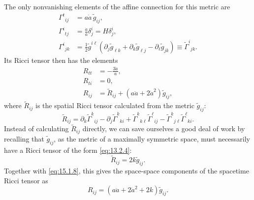 The only nonvanishing elements of the affine connection for this metric are
\begin{align}
  \Gamma^t{}_{ij}
  &=a\dot a\,\widetilde g_{ij},
  \tag{15.1.3}\label{eq:15.1.3}\\
  \Gamma^i{}_{tj}
  &=\frac{\dot a}{a}\delta^i_j
  =H\delta^i_j,
  \tag{15.1.4}\label{eq:15.1.4}\\
  \Gamma^i{}_{jk}
  &=\frac12\widetilde g^{i\ell}
    \left(
      \partial_j\widetilde g_{\ell k}
      +\partial_k\widetilde g_{\ell j}
      -\partial_\ell\widetilde g_{jk}
    \right)
  \equiv\widetilde\Gamma^i{}_{jk}.
  \tag{15.1.5}\label{eq:15.1.5}
\end{align}
Its Ricci tensor then has the elements
\begin{align}
  R_{tt}
  &=-\frac{3\ddot a}{a},
  \tag{15.1.6}\label{eq:15.1.6}\\
  R_{ti}
  &=0,
  \tag{15.1.7}\label{eq:15.1.7}\\
  R_{ij}
  &=\widetilde R_{ij}
    +(a\ddot a+2\dot a^2)\widetilde g_{ij},
  \tag{15.1.8}\label{eq:15.1.8}
\end{align}
where \(\widetilde R_{ij}\) is the spatial Ricci tensor calculated from the
metric \(\widetilde g_{ij}\):
\begin{equation}
  \widetilde R_{ij}
  =
  \partial_k\widetilde\Gamma^k{}_{ij}
  -\partial_j\widetilde\Gamma^k{}_{ki}
  +\widetilde\Gamma^k{}_{k\ell}\widetilde\Gamma^\ell{}_{ij}
  -\widetilde\Gamma^k{}_{j\ell}\widetilde\Gamma^\ell{}_{ki}.
  \tag{15.1.9}\label{eq:15.1.9}
\end{equation}
Instead of calculating \(\widetilde R_{ij}\) directly, we can save ourselves
a good deal of work by recalling that \(\widetilde g_{ij}\), as the metric
of a maximally symmetric space, must necessarily have a Ricci tensor of the
form \eqref{eq:13.2.4}:
\begin{equation}
  \widetilde R_{ij}=2k\widetilde g_{ij}.
  \tag{15.1.10}\label{eq:15.1.10}
\end{equation}
Together with \eqref{eq:15.1.8}, this gives the space-space components of the
spacetime Ricci tensor as
\begin{equation}
  R_{ij}
  =(a\ddot a+2\dot a^2+2k)\widetilde g_{ij}.
  \tag{15.1.11}\label{eq:15.1.11}
\end{equation}

